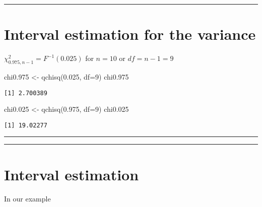 \documentclass[
]{book}
\newenvironment{Shaded}{\begin{snugshade}}{\end{snugshade}}
\newcommand{\AttributeTok}[1]{\textcolor[rgb]{0.77,0.63,0.00}{#1}}
\newcommand{\DecValTok}[1]{\textcolor[rgb]{0.00,0.00,0.81}{#1}}
\newcommand{\FloatTok}[1]{\textcolor[rgb]{0.00,0.00,0.81}{#1}}
\newcommand{\FunctionTok}[1]{\textcolor[rgb]{0.00,0.00,0.00}{#1}}
\newcommand{\NormalTok}[1]{#1}
\newcommand{\OtherTok}[1]{\textcolor[rgb]{0.56,0.35,0.01}{#1}}
\begin{document}
\begin{center}\rule{0.5\linewidth}{0.5pt}\end{center}

\hypertarget{interval-estimation-for-the-variance-3}{%
\section{Interval estimation for the variance}\label{interval-estimation-for-the-variance-3}}

\(\chi^2_{0.975,n-1}=F^{-1}(0.025)\)
for \(n=10\) or \(df=n-1=9\)

\begin{Shaded}
\begin{Highlighting}[]
\NormalTok{chi0}\FloatTok{.975} \OtherTok{\textless{}{-}} \FunctionTok{qchisq}\NormalTok{(}\FloatTok{0.025}\NormalTok{, }\AttributeTok{df=}\DecValTok{9}\NormalTok{)}
\NormalTok{chi0}\FloatTok{.975}
\end{Highlighting}
\end{Shaded}

\begin{verbatim}
[1] 2.700389
\end{verbatim}

\begin{Shaded}
\begin{Highlighting}[]
\NormalTok{chi0}\FloatTok{.025} \OtherTok{\textless{}{-}} \FunctionTok{qchisq}\NormalTok{(}\FloatTok{0.975}\NormalTok{, }\AttributeTok{df=}\DecValTok{9}\NormalTok{)}
\NormalTok{chi0}\FloatTok{.025}
\end{Highlighting}
\end{Shaded}

\begin{verbatim}
[1] 19.02277
\end{verbatim}

\begin{center}\rule{0.5\linewidth}{0.5pt}\end{center}

\begin{center}\rule{0.5\linewidth}{0.5pt}\end{center}

\hypertarget{interval-estimation-9}{%
\section{Interval estimation}\label{interval-estimation-9}}

In our example
\end{document}
